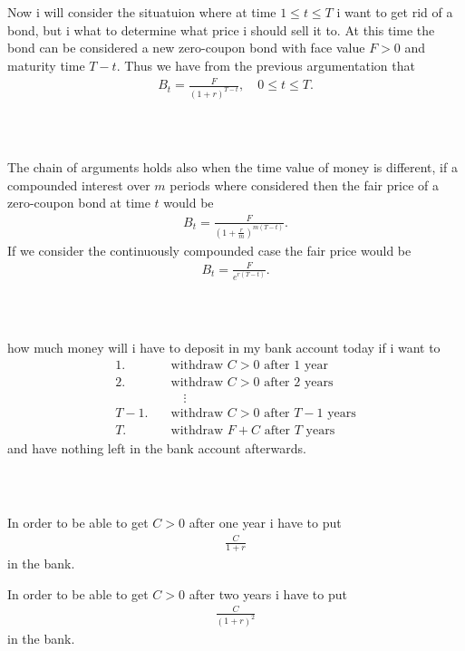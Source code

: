 \documentclass{beamer}
\numberwithin{equation}{section}
\begin{document}
\begin{frame}\frametitle{{\normalsize \secname} \\ {\large \subsecname}}
    Now i will consider the situatuion where at time $1 \leq t \leq T$ i want to get rid of a bond, but i what to determine what price i should sell it to.
    At this time the bond can be considered a new zero-coupon bond with face value $F > 0$ and maturity time $T - t$.
    Thus we have from the previous argumentation that
    \begin{align}
        B_t = \frac{F}{(1 + r)^{T - t}}, \quad 0 \leq t \leq T.
    \end{align} 
\end{frame}

\begin{frame}\frametitle{{\normalsize \secname} \\ {\large \subsecname}}
    The chain of arguments holds also when the time value of money is different, if a compounded interest over $m$ periods where considered then the fair price of a zero-coupon bond at time $t$ would be
    \begin{align}
        B_t = \frac{F}{\left(1 + \frac{r}{m}\right)^{m(T - t)}}.
    \end{align}
    If we consider the continuously compounded case the fair price would be
    \begin{align}
        B_t = \frac{F}{e^{r(T -t)}}.
    \end{align}
\end{frame}

\begin{frame}\frametitle{{\normalsize \secname} \\ {\large \subsecname}}
    how much money will i have to deposit in my bank account today if i want to
    \begin{align}
        \text{1.} \quad &\text{withdraw $C > 0$ after 1 year} \\
        \text{2.} \quad &\text{withdraw $C > 0$ after 2 years} \\
        &\quad \vdots \nonumber \\
        \text{$T-1$.} \quad &\text{withdraw $C > 0$ after $T-1$ years} \\
        \text{$T$.} \quad &\text{withdraw $F + C$ after $T$ years}
    \end{align}
    and have nothing left in the bank account afterwards.
\end{frame}

\begin{frame}\frametitle{{\normalsize \secname} \\ {\large \subsecname}}
    In order to be able to get $C > 0$ after one year i have to put
    \begin{align}
        \frac{C}{1+r}
    \end{align}
    in the bank.
    \pause

    In order to be able to get $C > 0$ after two years i have to put 
    \begin{align}
        \frac{C}{(1+r)^2}
    \end{align}
    in the bank.
\end{frame}
\end{document}
